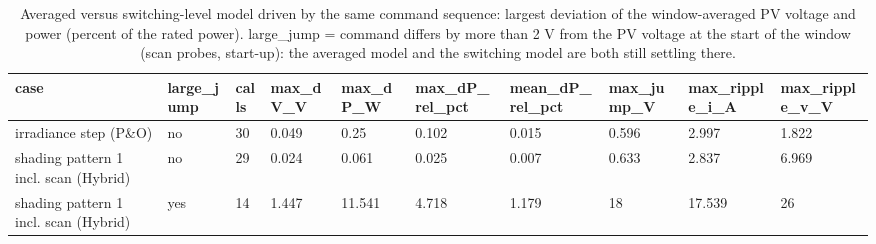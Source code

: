 \begin{table}[t]
\centering
\caption{Averaged versus switching-level model driven by the same command sequence: largest deviation of the window-averaged PV voltage and power (percent of the rated power). large\_jump = command differs by more than 2 V from the PV voltage at the start of the window (scan probes, start-up): the averaged model and the switching model are both still settling there.}
\label{tab:Table_Converter_Verification}
\small
\begin{tabular}{llllllllll}
\hline
case & large\_jump & calls & max\_dV\_V & max\_dP\_W & max\_dP\_rel\_pct & mean\_dP\_rel\_pct & max\_jump\_V & max\_ripple\_i\_A & max\_ripple\_v\_V \\
\hline
irradiance step (P\&O) & no & 30 & 0.049 & 0.25 & 0.102 & 0.015 & 0.596 & 2.997 & 1.822 \\
shading pattern 1 incl. scan (Hybrid) & no & 29 & 0.024 & 0.061 & 0.025 & 0.007 & 0.633 & 2.837 & 6.969 \\
shading pattern 1 incl. scan (Hybrid) & yes & 14 & 1.447 & 11.541 & 4.718 & 1.179 & 18 & 17.539 & 26 \\
\hline
\end{tabular}
\end{table}
